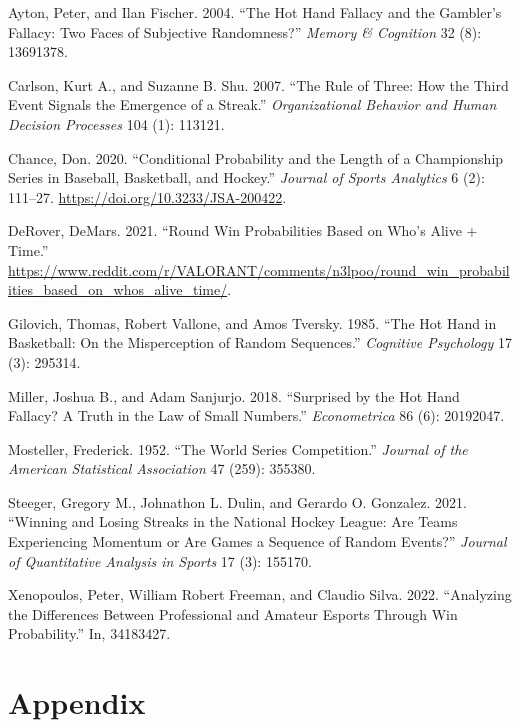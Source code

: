 \documentclass{article}
\newlength{\cslhangindent}
\newlength{\cslentryspacingunit} %
\newenvironment{CSLReferences}[2] %
 {%
  \setlength{\parindent}{0pt}
  \ifodd #1
  \let\oldpar\par
  \def\par{\hangindent=\cslhangindent\oldpar}
  \fi
  \setlength{\parskip}{#2\cslentryspacingunit}
 }%
 {}
\begin{document}
\hypertarget{refs}{}
\begin{CSLReferences}{1}{0}
\leavevmode{}%
Ayton, Peter, and Ilan Fischer. 2004. {``The Hot Hand Fallacy and the
Gambler{'}s Fallacy: Two Faces of Subjective Randomness?''} \emph{Memory
\& Cognition} 32 (8): 13691378.

\leavevmode{}%
Carlson, Kurt A., and Suzanne B. Shu. 2007. {``The Rule of Three: How
the Third Event Signals the Emergence of a Streak.''}
\emph{Organizational Behavior and Human Decision Processes} 104 (1):
113121.

\leavevmode{}%
Chance, Don. 2020. {``Conditional Probability and the Length of a
Championship Series in Baseball, Basketball, and Hockey.''}
\emph{Journal of Sports Analytics} 6 (2): 111--27.
\url{https://doi.org/10.3233/JSA-200422}.

\leavevmode{}%
DeRover, DeMars. 2021. {``Round Win Probabilities Based on Who's Alive +
Time.''}
\url{https://www.reddit.com/r/VALORANT/comments/n3lpoo/round_win_probabilities_based_on_whos_alive_time/}.

\leavevmode{}%
Gilovich, Thomas, Robert Vallone, and Amos Tversky. 1985. {``The Hot
Hand in Basketball: On the Misperception of Random Sequences.''}
\emph{Cognitive Psychology} 17 (3): 295314.

\leavevmode{}%
Miller, Joshua B., and Adam Sanjurjo. 2018. {``Surprised by the Hot Hand
Fallacy? A Truth in the Law of Small Numbers.''} \emph{Econometrica} 86
(6): 20192047.

\leavevmode{}%
Mosteller, Frederick. 1952. {``The World Series Competition.''}
\emph{Journal of the American Statistical Association} 47 (259): 355380.

\leavevmode{}%
Steeger, Gregory M., Johnathon L. Dulin, and Gerardo O. Gonzalez. 2021.
{``Winning and Losing Streaks in the National Hockey League: Are Teams
Experiencing Momentum or Are Games a Sequence of Random Events?''}
\emph{Journal of Quantitative Analysis in Sports} 17 (3): 155170.

\leavevmode{}%
Xenopoulos, Peter, William Robert Freeman, and Claudio Silva. 2022.
{``Analyzing the Differences Between Professional and Amateur Esports
Through Win Probability.''} In, 34183427.

\end{CSLReferences}

\hypertarget{appendix}{%
\section*{Appendix}\label{appendix}}



\end{document}
